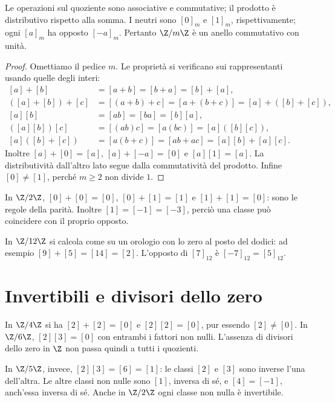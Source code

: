 \begin{proposizione}
Le operazioni sul quoziente sono associative e commutative; il prodotto è distributivo rispetto alla somma. I neutri sono $[0]_m$ e $[1]_m$, rispettivamente; ogni $[a]_m$ ha opposto $[-a]_m$. Pertanto $\Z/m\Z$ è un anello commutativo con unità.
\end{proposizione}
\begin{proof}
Omettiamo il pedice $m$. Le proprietà si verificano sui rappresentanti usando quelle degli interi:
\[
\begin{aligned}
[a]+[b]&=[a+b]=[b+a]=[b]+[a],\\
([a]+[b])+[c]&=[(a+b)+c]=[a+(b+c)]=[a]+([b]+[c]),\\
[a][b]&=[ab]=[ba]=[b][a],\\
([a][b])[c]&=[(ab)c]=[a(bc)]=[a]([b][c]),\\
[a]([b]+[c])&=[a(b+c)]=[ab+ac]=[a][b]+[a][c].
\end{aligned}
\]
Inoltre $[a]+[0]=[a]$, $[a]+[-a]=[0]$ e $[a][1]=[a]$. La distributività dall'altro lato segue dalla commutatività del prodotto. Infine $[0]\ne[1]$, perché $m\ge2$ non divide $1$.
\end{proof}

\begin{esempio}
In $\Z/2\Z$, $[0]+[0]=[0]$, $[0]+[1]=[1]$ e $[1]+[1]=[0]$: sono le regole della parità. Inoltre $[1]=[-1]=[-3]$, perciò una classe può coincidere con il proprio opposto.

In $\Z/12\Z$ si calcola come su un orologio con lo zero al posto del dodici: ad esempio $[9]+[5]=[14]=[2]$. L'opposto di $[7]_{12}$ è $[-7]_{12}=[5]_{12}$.
\end{esempio}

\begin{schema}
\end{schema}

\section{Invertibili e divisori dello zero}
\begin{esempio}
In $\Z/4\Z$ si ha $[2]+[2]=[0]$ e $[2][2]=[0]$, pur essendo $[2]\ne[0]$. In $\Z/6\Z$, $[2][3]=[0]$ con entrambi i fattori non nulli. L'assenza di divisori dello zero in $\Z$ non passa quindi a tutti i quozienti.

In $\Z/5\Z$, invece, $[2][3]=[6]=[1]$: le classi $[2]$ e $[3]$ sono inverse l'una dell'altra. Le altre classi non nulle sono $[1]$, inversa di sé, e $[4]=[-1]$, anch'essa inversa di sé. Anche in $\Z/2\Z$ ogni classe non nulla è invertibile.
\end{esempio}

